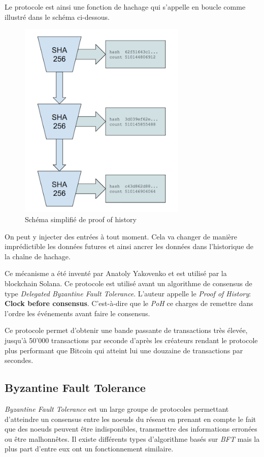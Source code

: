 \documentclass[../tb_report.tex]{subfiles}
\begin{document}
Le protocole est ainsi une fonction de hachage qui s'appelle en boucle comme illustré dans le schéma ci-dessous.

\begin{figure}[H]
    \centering
    \includegraphics[width=8cm]{images/solana}
    \caption{Schéma simplifié de proof of history}
\end{figure}

On peut y injecter des entrées à tout moment. Cela va changer de manière imprédictible les données futures et ainsi ancrer les données dans l'historique de la chaîne de hachage.

Ce mécanisme a été inventé par Anatoly Yakovenko et est utilisé par la blockchain Solana. Ce protocole est utilisé avant un algorithme de consensus de type \emph{Delegated Byzantine Fault Tolerance}. L'auteur appelle le \emph{Proof of History}: \textbf{Clock before consensus}. C'est-à-dire que le \emph{PoH} ce charges de remettre dans l'ordre les événements avant faire le consensus.

Ce protocole permet d'obtenir une bande passante de transactions très élevée, jusqu'à 50'000 transactions par seconde d'après les créateurs rendant le protocole plus performant que Bitcoin qui atteint lui une douzaine de transactions par secondes.

\subsection{Byzantine Fault Tolerance}

\textit{Byzantine Fault Tolerance} est un large groupe de protocoles permettant d'atteindre un consensus entre les noeuds du réseau en prenant en compte le fait que des noeuds peuvent être indisponibles, transmettre des informations erronées ou être malhonnêtes. Il existe différents types d'algorithme basés sur \textit{BFT} mais la plus part d'entre eux ont un fonctionnement similaire. 
\end{document}
